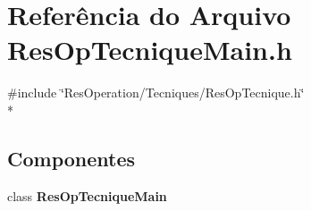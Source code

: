 \section{Referência do Arquivo Res\+Op\+Tecnique\+Main.\+h}
\label{_res_op_tecnique_main_8h}
{\ttfamily \#include \char`\"{}Res\+Operation/\+Tecniques/\+Res\+Op\+Tecnique.\+h\char`\"{}}\\*
\subsection*{Componentes}
\begin{DoxyCompactItemize}
\item 
class {\bf Res\+Op\+Tecnique\+Main}
\end{DoxyCompactItemize}
